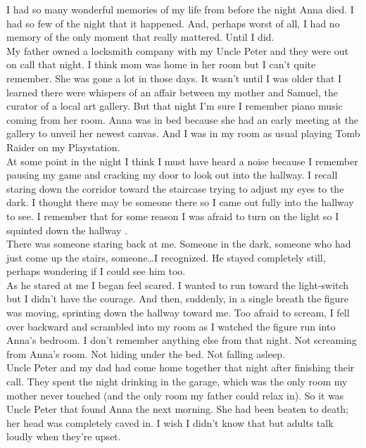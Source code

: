 \documentclass[a5paper]{scrartcl}
\begin{document}
I had so many wonderful memories of my life from before the night Anna died. I had so few of the night that it happened. And, perhaps worst of all, I had no memory of the only moment that really mattered. Until I did. \\


My father owned a locksmith company with my Uncle Peter and they were out on call that night. I think mom was home in her room but I can't quite remember.  She was gone a lot in those days. It wasn't until I was older that I learned there were whispers of an affair between my mother and Samuel, the curator of a local art gallery. But that night I'm sure I remember piano music coming from her room. Anna was in bed because she had an early meeting at the gallery to unveil her newest canvas. And I was in my room as usual playing Tomb Raider on my Playstation. \\


At some point in the night I think I must have heard a noise because I remember pausing my game and cracking my door to look out into the hallway. I recall staring down the corridor toward the staircase trying to adjust my eyes to the dark. I thought there may be someone there so I came out fully into the hallway to see. I remember that for some reason I was afraid to turn on the light so I squinted down the hallway .\\


There was someone staring back at me. Someone in the dark, someone who had just come up the stairs, someone\dots I recognized. He stayed completely still, perhaps wondering if I could see him too. \\


As he stared at me I began feel scared. I wanted to run toward the light-switch but I didn't have the courage. And then, suddenly, in a single breath the figure was moving, sprinting down the hallway toward me.  Too afraid to scream, I fell over backward and scrambled into my room as I watched the figure run into Anna's bedroom. I don't remember anything else from that night. Not screaming from Anna's room. Not hiding under the bed. Not falling asleep. \\


Uncle Peter and my dad had come home together that night after finishing their call. They spent the night drinking in the garage, which was the only room my mother never touched (and the only room my father could relax in). So it was Uncle Peter that found Anna the next morning. She had been beaten to death; her head was completely caved in. I wish I didn't know that but adults talk loudly when they're upset. \\
\end{document}
